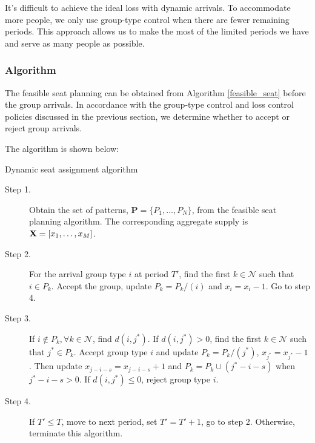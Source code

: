 It's difficult to achieve the ideal loss with dynamic arrivals. To accommodate more people, we only use group-type control when there are fewer remaining periods. This approach allows us to make the most of the limited periods we have and serve as many people as possible.




\subsubsection{Algorithm}
The feasible seat planning can be obtained from Algorithm \ref{feasible_seat} before the group arrivals. In accordance with the group-type control and loss control policies discussed in the previous section, we determine whether to accept or reject group arrivals.


The algorithm is shown below:

\begin{algorithm}[H]
  \caption{Dynamic seat assignment algorithm}\label{algo_nested_policy}
  \begin{description}
    \item[Step 1.] Obtain the set of patterns, $\mathbf{P} = \{P_1,\ldots,P_{N}\}$, from the feasible seat planning algorithm. The corresponding aggregate supply is $\mathbf{X} = [x_{1}, \ldots, x_{M}]$.
    \item[Step 2.] For the arrival group type $i$ at period $T{'}$, find the first $k \in \mathcal{N}$ such that $i \in P_k$. Accept the group, update $P_{k} = P_{k}/(i)$ and $x_{i} = x_{i} -1$. Go to step 4.
    \item[Step 3.] If $i \notin P_k, \forall k \in \mathcal{N}$, find $d(i,j^{*})$. If $d(i,j^{*})>0$, find the first $k \in \mathcal{N}$ such that $j^{*} \in P_k$. Accept group type $i$ and update $P_{k} = P_{k}/(j^{*})$, $x_{j^{*}} = x_{j^{*}} -1$. Then update $x_{j-i-s} = x_{j-i-s} + 1$ and $P_{k}= P_{k} \cup (j^{*}-i-s)$ when $j^{*}-i-s > 0$. If $d(i,j^{*}) \leq 0$, reject group type $i$.
    \item[Step 4.] If $T{'} \leq T$, move to next period, set $T{'} = T{'}+1$, go to step 2. Otherwise, terminate this algorithm.
  \end{description}
\end{algorithm}

